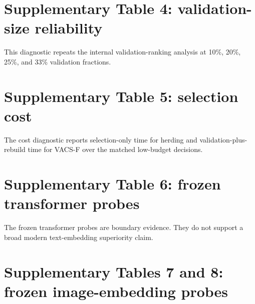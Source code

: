 \documentclass[12pt]{article}
\begin{document}
\begin{center}
\scriptsize
\setlength{\tabcolsep}{2.2pt}
\resizebox{0.90\linewidth}{!}{}
\end{center}

\section*{Supplementary Table 4: validation-size reliability}

This diagnostic repeats the internal validation-ranking analysis at 10\%, 20\%, 25\%, and 33\% validation fractions.

\begin{center}
\scriptsize
\setlength{\tabcolsep}{2.2pt}
\resizebox{0.90\linewidth}{!}{}
\end{center}

\section*{Supplementary Table 5: selection cost}

The cost diagnostic reports selection-only time for herding and validation-plus-rebuild time for VACS-F over the matched low-budget decisions.

\begin{center}
\small
\resizebox{0.90\linewidth}{!}{}
\end{center}

\section*{Supplementary Table 6: frozen transformer probes}

The frozen transformer probes are boundary evidence. They do not support a broad modern text-embedding superiority claim.

\begin{center}
\small
\resizebox{0.88\linewidth}{!}{}
\end{center}

\section*{Supplementary Tables 7 and 8: frozen image-embedding probes}
\end{document}
